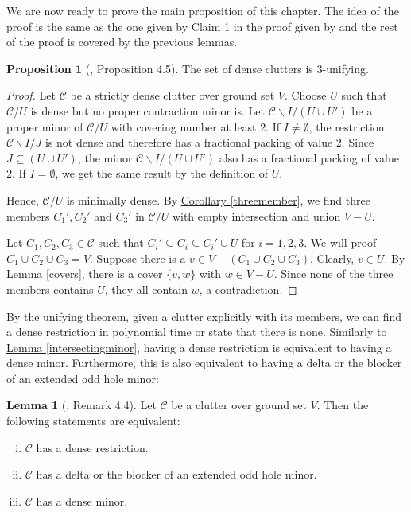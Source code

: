 \documentclass[a4paper, 12pt]{scrbook}
\theoremstyle{definition}
\newtheorem{lemma}[theorem]{Lemma}
\newtheorem{proposition}[theorem]{Proposition}
\begin{document}
   We are now ready to prove the main proposition of this chapter.
   The idea of the proof is the same as the one given by Claim 1 in the proof given by \cite{restrictions} and the rest of the proof is covered by the previous lemmas.
   \begin{proposition}[\cite{restrictions}, Proposition 4.5]
       The set of dense clutters is 3-unifying.
   \end{proposition}

   \begin{proof}
       Let $\mathcal{C}$ be a strictly dense clutter over ground set $V$.
       Choose $U$ such that $\mathcal{C} / U$ is dense but no proper contraction minor is.
       Let $\mathcal{C} \backslash I / (U \cup U')$ be a proper minor of $\mathcal{C} /U$ with covering number at least 2.
       If $I \neq \emptyset$, the restriction $\mathcal{C} \backslash I / J$ is not dense and therefore has a fractional packing of value 2.
       Since $J \subseteq (U \cup U')$, the minor $\mathcal{C} \backslash I / (U \cup U')$ also has a fractional packing of value 2.
       If $I=\emptyset$, we get the same result by the definition of $U$.

       Hence, $\mathcal{C}/U$ is minimally dense.
       By \hyperref[threemember]{Corollary \ref*{threemember}}, we find three members $C_1', C_2'$ and $C_3'$ in $\mathcal{C}/U$ with empty intersection and union $V - U$.

       Let $C_1, C_2, C_3 \in \mathcal{C}$ such that $C_i' \subseteq C_i \subseteq C_i' \cup U$ for $i=1,2,3$.
       We will proof $C_1 \cup C_2 \cup C_3 = V$.
       Suppose there is a $v \in V-(C_1 \cup C_2 \cup C_3)$.
       Clearly, $v \in U$.
       By \hyperref[covers]{Lemma \ref*{covers}}, there is a cover $\{v,w\}$ with $w \in V-U$.
       Since none of the three members contains $U$, they all contain $w$, a contradiction.
   \end{proof}

   By the unifying theorem, given a clutter explicitly with its members, we can find a dense restriction in polynomial time or state that there is none. Similarly to \hyperref[intersectingminor]{Lemma \ref*{intersectingminor}}, having a dense restriction is equivalent to having a dense minor. Furthermore, this is also equivalent to having a delta or the blocker of an extended odd hole minor:
   \begin{lemma}[\cite{restrictions}, Remark 4.4]
       Let $\mathcal{C}$ be a clutter over ground set $V$. Then the following statements are equivalent:
       \leavevmode
       \begin{enumerate}[(i)]
           \item $\mathcal{C}$ has a dense restriction.
           \item $\mathcal{C}$ has a delta or the blocker of an extended odd hole minor.
           \item $\mathcal{C}$ has a dense minor.
       \end{enumerate}
   \end{lemma}
\end{document}
